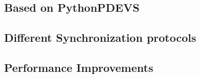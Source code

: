 \subsection{Based on PythonPDEVS}
\subsection{Different Synchronization protocols}
\subsection{Performance Improvements}
